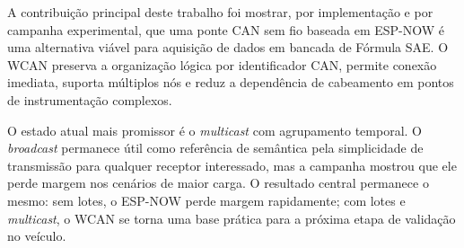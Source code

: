A contribuição principal deste trabalho foi mostrar, por implementação e por
campanha experimental, que uma ponte CAN sem fio baseada em ESP-NOW é uma
alternativa viável para aquisição de dados em bancada de Fórmula SAE. O WCAN
preserva a organização lógica por identificador CAN, permite conexão imediata, suporta
múltiplos nós e reduz a dependência de cabeamento em pontos de instrumentação
complexos.

O estado atual mais promissor é o \emph{multicast} com agrupamento temporal. O
\emph{broadcast} permanece útil como referência de semântica pela simplicidade de transmissão para qualquer receptor interessado, mas a
campanha mostrou que ele perde margem nos cenários de maior carga. O resultado
central permanece o mesmo: sem lotes, o ESP-NOW perde margem rapidamente; com
lotes e \emph{multicast}, o WCAN se torna uma base prática para a próxima etapa
de validação no veículo.
